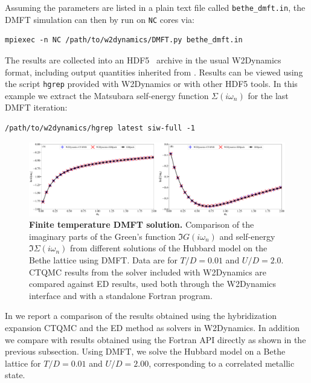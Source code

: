 \documentclass[edipack_sp.tex]{subfiles}
\begin{document}
Assuming the parameters are listed in a plain text file called 
{\tt bethe\_dmft.in}, the DMFT simulation can then by run on {\tt NC} cores via:
\begin{lstlisting}[style=mybash,numbers=none,morekeywords={mpiexec},deletekeywords={in}]
mpiexec -n NC /path/to/w2dynamics/DMFT.py bethe_dmft.in
\end{lstlisting}

The results are collected into an HDF5~\cite{The_HDF_Group_Hierarchical_Data_Format} archive in the usual W2Dynamics format, including output quantities inherited from \NAME. Results can be viewed using the script {\tt hgrep} provided with W2Dynamics or with other HDF5 tools. In this example we extract the Matsubara self-energy function $\Sigma(i\omega_n)$ for the last DMFT iteration:
\begin{lstlisting}[style=mybash,numbers=none]
/path/to/w2dynamics/hgrep latest siw-full -1
\end{lstlisting}

\begin{figure}%
  \includegraphics[width=\linewidth]{figures/figBetheW2D.pdf}
    \caption{\label{figEx1W}%
    \textbf{Finite temperature DMFT solution.}
    Comparison of the imaginary parts of the Green's function $\Im{G}(i\omega_n)$ and self-energy $\Im{\Sigma}(i\omega_n)$ from different solutions of the Hubbard model on the Bethe lattice using DMFT. Data are for $T/D=0.01$ and $U/D=2.0$. CTQMC results from the solver included with W2Dynamics are compared against \NAME ED results, used both through the W2Dynamics interface and with a standalone Fortran program. 
        }
\end{figure}

In  we report a comparison of the results obtained using the hybridization expansion CTQMC and the \NAME ED method as solvers in W2Dynamics. In addition we compare with results obtained using the Fortran API directly as shown in the previous subsection. Using DMFT, we solve the Hubbard model on a Bethe lattice for $T/D=0.01$ and $U/D=2.00$, corresponding to a correlated metallic state. 
\end{document}
